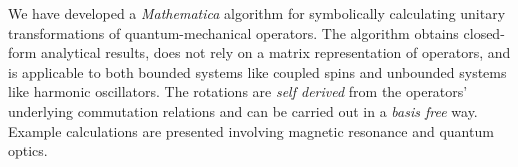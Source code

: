 
We have developed a \emph{Mathematica} algorithm for symbolically calculating unitary transformations of quantum-mechanical operators.  The algorithm obtains closed-form analytical results, does not rely on a matrix representation of operators, and is applicable to both bounded systems like coupled spins and unbounded systems like harmonic oscillators.  The rotations are \emph{self derived} from the operators' underlying commutation relations and can be carried out in a \emph{basis free} way.  Example calculations are presented involving magnetic resonance and quantum optics.  